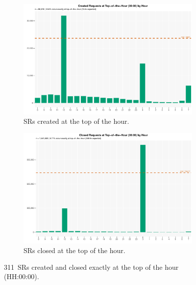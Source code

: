 \documentclass[linenumber]{jdsart}
\begin{document}
\begin{figure}[tbp]
  \centering
  \begin{subfigure}[b]{0.49\textwidth}
    \includegraphics[width=\textwidth]{created_top_of_hour_distribution.pdf}
    \caption{\textsc{SR}s created at the top of the hour.}
    \label{fig:created_top_hour}
  \end{subfigure}
  \hfill
  \begin{subfigure}[b]{0.49\textwidth}
    \includegraphics[width=\textwidth]{closed_top_of_hour_distribution.pdf}
    \caption{\textsc{SR}s closed at the top of the hour.}
    \label{fig:closed_top_hour}
  \end{subfigure}
  \caption{311~\textsc{SR}s created and closed exactly at the top of the hour (HH{:}00{:}00).}
  \label{fig:exacthours}
\end{figure}

\end{document}
